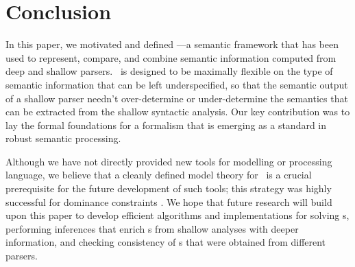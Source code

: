 \section{Conclusion}
\label{sec:conclusion}

In this paper, we motivated and defined \rmrs---a semantic framework
that has been used to represent, compare, and combine semantic
information computed from deep and shallow parsers.  \rmrs\ is
designed to be maximally flexible on the type of semantic information
that can be left underspecified, so that the semantic output of a
shallow parser needn't over-determine or under-determine the semantics
that can be extracted from the shallow syntactic analysis.  Our key
contribution was to lay the formal foundations for a formalism that is
emerging as a standard in robust semantic processing.

Although we have not directly provided new tools for modelling or
processing language, we believe that a cleanly defined model theory
for \rmrs\ is a crucial prerequisite for the future development of
such tools; this strategy was highly successful for dominance
constraints \cite{Althaus_etal:JoA}. We hope that future research will
build upon this paper to develop efficient algorithms and
implementations for solving \rmrs s, performing inferences that enrich
\rmrs s from shallow analyses with deeper information, and checking
consistency of \rmrs s that were obtained from different parsers.

